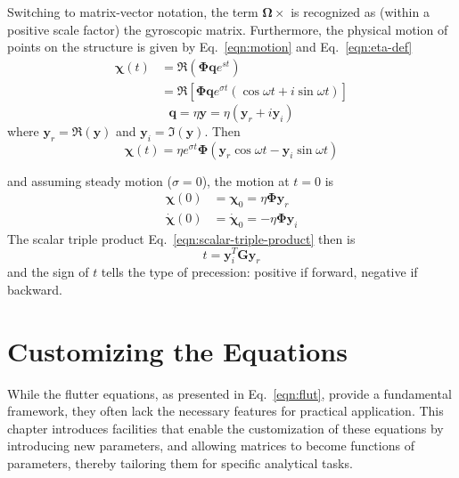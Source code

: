 \documentclass[10pt,openany,twoside]{book}
\numberwithin{equation}{section}   %
\newcommand{\Matrix}[1]{\boldsymbol{#1}}
\newcommand{\Vector}[1]{\boldsymbol{#1}}
\newcommand{\Eqn}[1]{Eq.\ \ref{#1}}
\begin{document}
Switching to matrix-vector notation, the term $\Vector{\Omega}\times$ is
recognized as (within a positive scale factor) the gyroscopic matrix.
Furthermore, the physical motion of points on the structure is given by
\Eqn{eqn:motion} and \Eqn{eqn:eta-def}
\begin{align} %
\Vector{\chi}(t) & =  \Re \left(\Matrix{\Phi}\Vector{q}e^{st}\right) \nonumber \\
              & =  \Re \left[\Matrix{\Phi}\Vector{q} e^{\sigma t}
				  			\left(\cos \omega t + i \sin \omega t \right) \right]	\nonumber
\end{align}
\begin{equation}
\Vector{q} = \eta \Vector{y} = \eta \left(\Vector{y}_r + i\Vector{y}_i \right) \nonumber
\end{equation}
where $\Vector{y}_r = \Re(\Vector{y})$ and $\Vector{y}_i = \Im(\Vector{y})$. Then
\begin{equation}
\Vector{\chi}(t) = \eta e^{\sigma t} \Matrix{\Phi}\left(\Vector{y}_r \cos \omega t
			- \Vector{y}_i \sin \omega t \right) \nonumber
\end{equation}

and assuming steady motion ($\sigma=0$), the motion at $t=0$ is
\begin{align}
\Vector{\chi}(0) &= \Vector{\chi}_0 = \eta\Matrix{\Phi}\Vector{y}_r \nonumber \\
\dot{\Vector{\chi}}(0) &= \dot{\Vector{\chi}}_0 =
		-\eta \Matrix{\Phi} \Vector{y}_i	\nonumber
\end{align}
The scalar triple product \Eqn{eqn:scalar-triple-product} then is
\begin{equation}
t = \Vector{y}_i^T\Matrix{G}\Vector{y}_r
\end{equation}
and the sign of $t$ tells the type of precession: positive if forward,
negative if backward.



\chapter{Customizing the Equations}\label{chap:tailoring}
While the flutter equations, as presented in \Eqn{eqn:flut}, provide
a fundamental framework, they often lack the necessary features for
practical application.
This chapter introduces facilities that enable
the customization of these equations by introducing new parameters, and
allowing matrices to become functions of parameters, thereby tailoring them
for specific analytical tasks.
\end{document}
